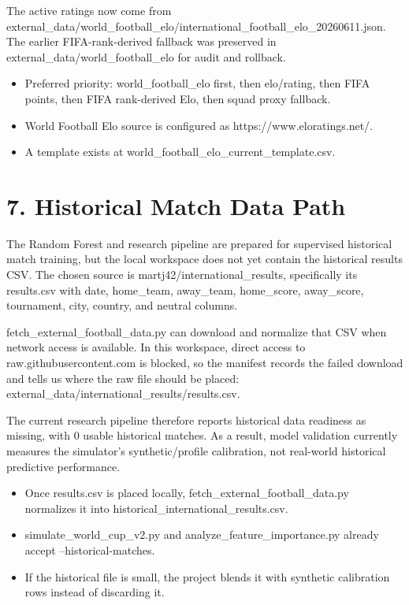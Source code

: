 \documentclass[10pt]{article}
\begin{document}
The active ratings now come from external\_data/world\_football\_elo/international\_football\_elo\_20260611.json. The earlier FIFA-rank-derived fallback was preserved in external\_data/world\_football\_elo for audit and rollback.

\begin{itemize}
  \item Preferred priority: world\_football\_elo first, then elo/rating, then FIFA points, then FIFA rank-derived Elo, then squad proxy fallback.
  \item World Football Elo source is configured as https://www.eloratings.net/.
  \item A template exists at world\_football\_elo\_current\_template.csv.
\end{itemize}

\section{7. Historical Match Data Path}

The Random Forest and research pipeline are prepared for supervised historical match training, but the local workspace does not yet contain the historical results CSV. The chosen source is martj42/international\_results, specifically its results.csv with date, home\_team, away\_team, home\_score, away\_score, tournament, city, country, and neutral columns.

fetch\_external\_football\_data.py can download and normalize that CSV when network access is available. In this workspace, direct access to raw.githubusercontent.com is blocked, so the manifest records the failed download and tells us where the raw file should be placed: external\_data/international\_results/results.csv.

The current research pipeline therefore reports historical data readiness as missing, with 0 usable historical matches. As a result, model validation currently measures the simulator's synthetic/profile calibration, not real-world historical predictive performance.

\begin{itemize}
  \item Once results.csv is placed locally, fetch\_external\_football\_data.py normalizes it into historical\_international\_results.csv.
  \item simulate\_world\_cup\_v2.py and analyze\_feature\_importance.py already accept --historical-matches.
  \item If the historical file is small, the project blends it with synthetic calibration rows instead of discarding it.
\end{itemize}
\end{document}
